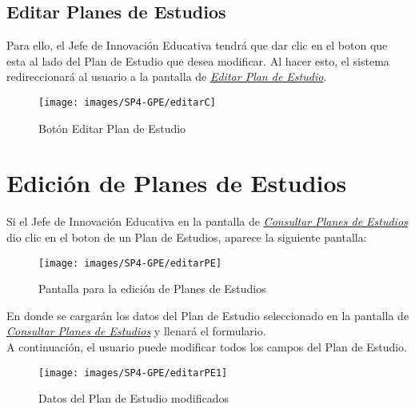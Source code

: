 \subsection{Editar Planes de Estudios}

Para ello, el Jefe de Innovación Educativa tendrá que dar clic en el boton  que esta al lado del Plan de Estudio que desea modificar. Al hacer esto, el sistema redireccionará al usuario a la pantalla de \hyperlink{editarPE}{\textit{Editar Plan de Estudio}}.

\begin{figure}[!hbtp]
	\centering
	\hypertarget{editar}{\texttt{[image: images/SP4-GPE/editarC]}}
	\caption{Botón Editar Plan de Estudio}
	\label{editar}
\end{figure}




\newpage
\section{Edición de Planes de Estudios}
Si el Jefe de Innovación Educativa en la pantalla de \hyperlink{consultarPE}{\textit{Consultar Planes de Estudios}} dio clic en el boton  de un Plan de Estudios, aparece la siguiente pantalla:

\begin{figure}[!hbtp]
	\centering
	\hypertarget{editarPE}{\texttt{[image: images/SP4-GPE/editarPE]}}
	\caption{Pantalla para la edición de Planes de Estudios}
	\label{editarPE}
\end{figure}

En donde se cargarán los datos del Plan de Estudio seleccionado en la pantalla de \hyperlink{consultarPE}{\textit{Consultar Planes de Estudios}} y llenará el formulario.\\
\newpage
A continuación, el usuario puede modificar todos los campos del Plan de Estudio.
\begin{figure}[!hbtp]
	\centering
	\hypertarget{modif}{\texttt{[image: images/SP4-GPE/editarPE1]}}
	\caption{Datos del Plan de Estudio modificados}
	\label{modif}
\end{figure}

